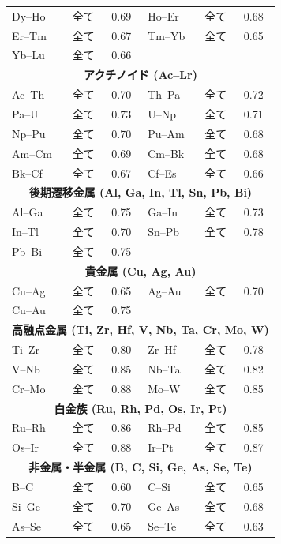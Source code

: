 \documentclass[12pt,a4paper]{article}
\begin{document}
\begin{longtable}{p{2.5cm} p{2.5cm} p{1.2cm} p{2.5cm} p{2.5cm} p{1.2cm}}
		Dy–Ho & 全て & 0.69 & Ho–Er & 全て & 0.68 \\
		Er–Tm & 全て & 0.67 & Tm–Yb & 全て & 0.65 \\
		Yb–Lu & 全て & 0.66 & & & \\
		\multicolumn{6}{c}{\textbf{アクチノイド (Ac–Lr)}} \\
		Ac–Th & 全て & 0.70 & Th–Pa & 全て & 0.72 \\
		Pa–U  & 全て & 0.73 & U–Np & 全て & 0.71 \\
		Np–Pu & 全て & 0.70 & Pu–Am & 全て & 0.68 \\
		Am–Cm & 全て & 0.69 & Cm–Bk & 全て & 0.68 \\
		Bk–Cf & 全て & 0.67 & Cf–Es & 全て & 0.66 \\
		\multicolumn{6}{c}{\textbf{後期遷移金属 (Al, Ga, In, Tl, Sn, Pb, Bi)}} \\
		Al–Ga & 全て & 0.75 & Ga–In & 全て & 0.73 \\
		In–Tl & 全て & 0.70 & Sn–Pb & 全て & 0.78 \\
		Pb–Bi & 全て & 0.75 & & & \\
		\multicolumn{6}{c}{\textbf{貴金属 (Cu, Ag, Au)}} \\
		Cu–Ag & 全て & 0.65 & Ag–Au & 全て & 0.70 \\
		Cu–Au & 全て & 0.75 & & & \\
		\multicolumn{6}{c}{\textbf{高融点金属 (Ti, Zr, Hf, V, Nb, Ta, Cr, Mo, W)}} \\
		Ti–Zr & 全て & 0.80 & Zr–Hf & 全て & 0.78 \\
		V–Nb & 全て & 0.85 & Nb–Ta & 全て & 0.82 \\
		Cr–Mo & 全て & 0.88 & Mo–W & 全て & 0.85 \\
		\multicolumn{6}{c}{\textbf{白金族 (Ru, Rh, Pd, Os, Ir, Pt)}} \\
		Ru–Rh & 全て & 0.86 & Rh–Pd & 全て & 0.85 \\
		Os–Ir & 全て & 0.88 & Ir–Pt & 全て & 0.87 \\
		\multicolumn{6}{c}{\textbf{非金属・半金属 (B, C, Si, Ge, As, Se, Te)}} \\
		B–C  & 全て & 0.60 & C–Si  & 全て & 0.65 \\
		Si–Ge & 全て & 0.70 & Ge–As & 全て & 0.68 \\
		As–Se & 全て & 0.65 & Se–Te & 全て & 0.63 \\
		\bottomrule
	\end{longtable}
	
\end{document}
